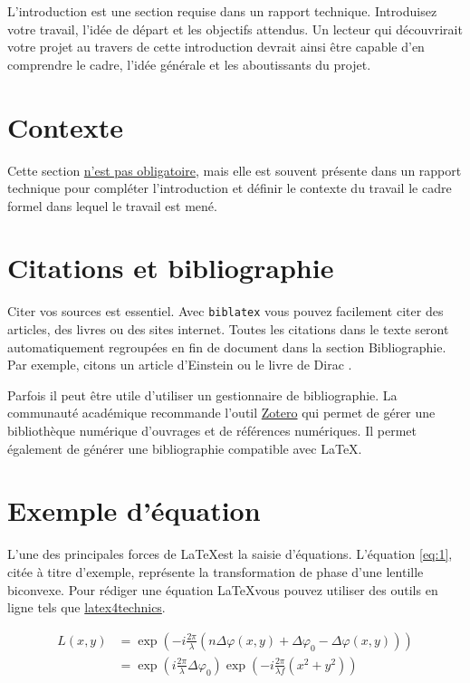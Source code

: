 L'introduction est une section requise dans un rapport technique. Introduisez votre travail, l'idée de départ et les objectifs attendus. Un lecteur qui découvrirait votre projet au travers de cette introduction devrait ainsi être capable d'en comprendre le cadre, l'idée générale et les aboutissants du projet.

\section{Contexte}
Cette section \underline{n'est pas obligatoire}, mais elle est souvent présente dans un rapport technique pour compléter l'introduction et définir le contexte du travail \cad le cadre formel dans lequel le travail est mené.

\section{Citations et bibliographie}
Citer vos sources est essentiel. Avec \texttt{biblatex} vous pouvez facilement citer des articles, des livres ou des sites internet. Toutes les citations dans le texte seront automatiquement regroupées en fin de document dans la section \guillemotleft Bibliographie\guillemotright. Par exemple, citons un article d'Einstein \cite{einstein} ou le livre de Dirac \cite{dirac}.

Parfois il peut être utile d'utiliser un gestionnaire de bibliographie. La communauté académique recommande l'outil \href{https://www.zotero.org/}{Zotero} qui permet de gérer une bibliothèque numérique d'ouvrages et de références numériques. Il permet également de générer une bibliographie compatible avec \LaTeX.

\section{Exemple d'équation}
L'une des principales forces de \LaTeX est la saisie d'équations. L'équation \ref{eq:1}, citée à titre d'exemple, représente la transformation de phase d'une lentille biconvexe. Pour rédiger une équation \LaTeX vous pouvez utiliser des outils en ligne tels que \href{https://www.latex4technics.com/}{latex4technics}.

\begin{equation} \label{eq:1}
    \begin{split}
        L(x,y) &= \exp\left( - i\frac{{2\pi }}{\lambda }\left( {n\Delta \varphi (x,y) + \Delta {\varphi _0} - \Delta \varphi (x,y)} \right)\right)\\
        &= {\exp\left({i\frac{{2\pi }}{\lambda }\Delta {\varphi _0}}\right)}{\exp\left({ - i\frac{{2\pi }}{{\lambda f}}({x^2} + {y^2})}\right)}
    \end{split}
\end{equation}

